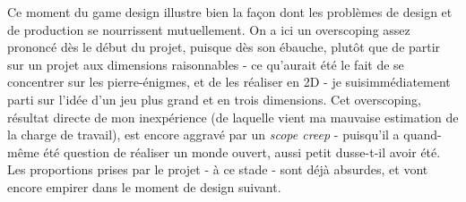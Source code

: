 \documentclass{scrartcl}
\begin{document}
	Ce moment du game design illustre bien la façon dont les problèmes de design et de production se nourrissent mutuellement. On a ici un overscoping assez prononcé dès le début du projet, puisque dès son ébauche, plutôt que de partir sur un projet aux dimensions raisonnables - ce qu'aurait été le fait de se concentrer sur les pierre-énigmes, et de les réaliser en 2D - je suisimmédiatement parti sur l'idée d'un jeu plus grand et en trois dimensions. Cet overscoping, résultat directe de mon inexpérience (de laquelle vient ma mauvaise estimation de la charge de travail), est encore aggravé par un \textit{scope creep} - puisqu'il a quand-même été question de réaliser un monde ouvert, aussi petit dusse-t-il avoir été. Les proportions prises par le projet - à ce stade - sont déjà absurdes, et vont encore empirer dans le moment de design suivant.\\
	
\end{document}
